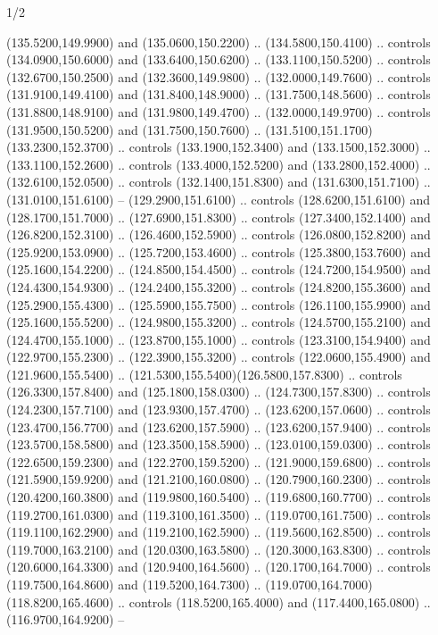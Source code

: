 \begin{flagdescription}{1/2}
\begin{scope}[xshift=\flaglength/6]
\begin{scope}[scale=0.00247\flagwidth,yshift=241mm,xshift=-27.1mm]
\begin{scope}[y=0.80pt, x=0.80pt, yscale=-0.9, xscale=1]
\begin{scope}[shift={(-53.94897,373.26853)},draw=red]
  (135.5200,149.9900) and (135.0600,150.2200) .. (134.5800,150.4100) .. controls
  (134.0900,150.6000) and (133.6400,150.6200) .. (133.1100,150.5200) .. controls
  (132.6700,150.2500) and (132.3600,149.9800) .. (132.0000,149.7600) .. controls
  (131.9100,149.4100) and (131.8400,148.9000) .. (131.7500,148.5600) .. controls
  (131.8800,148.9100) and (131.9800,149.4700) .. (132.0000,149.9700) .. controls
  (131.9500,150.5200) and (131.7500,150.7600) ..
  (131.5100,151.1700)(133.2300,152.3700) .. controls (133.1900,152.3400) and
  (133.1500,152.3000) .. (133.1100,152.2600) .. controls (133.4000,152.5200) and
  (133.2800,152.4000) .. (132.6100,152.0500) .. controls (132.1400,151.8300) and
  (131.6300,151.7100) .. (131.0100,151.6100) -- (129.2900,151.6100) .. controls
  (128.6200,151.6100) and (128.1700,151.7000) .. (127.6900,151.8300) .. controls
  (127.3400,152.1400) and (126.8200,152.3100) .. (126.4600,152.5900) .. controls
  (126.0800,152.8200) and (125.9200,153.0900) .. (125.7200,153.4600) .. controls
  (125.3800,153.7600) and (125.1600,154.2200) .. (124.8500,154.4500) .. controls
  (124.7200,154.9500) and (124.4300,154.9300) .. (124.2400,155.3200) .. controls
  (124.8200,155.3600) and (125.2900,155.4300) .. (125.5900,155.7500) .. controls
  (126.1100,155.9900) and (125.1600,155.5200) .. (124.9800,155.3200) .. controls
  (124.5700,155.2100) and (124.4700,155.1000) .. (123.8700,155.1000) .. controls
  (123.3100,154.9400) and (122.9700,155.2300) .. (122.3900,155.3200) .. controls
  (122.0600,155.4900) and (121.9600,155.5400) ..
  (121.5300,155.5400)(126.5800,157.8300) .. controls (126.3300,157.8400) and
  (125.1800,158.0300) .. (124.7300,157.8300) .. controls (124.2300,157.7100) and
  (123.9300,157.4700) .. (123.6200,157.0600) .. controls (123.4700,156.7700) and
  (123.6200,157.5900) .. (123.6200,157.9400) .. controls (123.5700,158.5800) and
  (123.3500,158.5900) .. (123.0100,159.0300) .. controls (122.6500,159.2300) and
  (122.2700,159.5200) .. (121.9000,159.6800) .. controls (121.5900,159.9200) and
  (121.2100,160.0800) .. (120.7900,160.2300) .. controls (120.4200,160.3800) and
  (119.9800,160.5400) .. (119.6800,160.7700) .. controls (119.2700,161.0300) and
  (119.3100,161.3500) .. (119.0700,161.7500) .. controls (119.1100,162.2900) and
  (119.2100,162.5900) .. (119.5600,162.8500) .. controls (119.7000,163.2100) and
  (120.0300,163.5800) .. (120.3000,163.8300) .. controls (120.6000,164.3300) and
  (120.9400,164.5600) .. (120.1700,164.7000) .. controls (119.7500,164.8600) and
  (119.5200,164.7300) .. (119.0700,164.7000)(118.8200,165.4600) .. controls
  (118.5200,165.4000) and (117.4400,165.0800) .. (116.9700,164.9200) --

\end{scope}
\end{scope}
\end{scope}
\end{scope}
\end{flagdescription}
